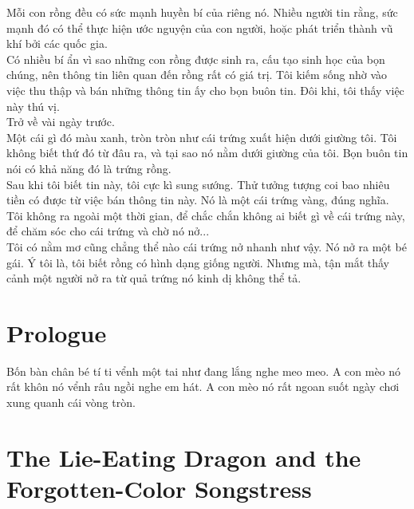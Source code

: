 \documentclass[13pt]{extarticle}
\begin{document}
	Mỗi con rồng đều có sức mạnh huyền bí của riêng nó. Nhiều người tin rằng, sức mạnh đó có thể thực hiện ước nguyện của con người, hoặc phát triển thành vũ khí bởi các quốc gia. \\
	
	Có nhiều bí ẩn vì sao những con rồng được sinh ra, cấu tạo sinh học của bọn chúng, nên thông tin liên quan đến rồng rất có giá trị. Tôi kiếm sống nhờ vào việc thu thập và bán những thông tin ấy cho bọn buôn tin. Đôi khi, tôi thấy việc này thú vị. \\
	
	Trở về vài ngày trước. \\
	
	Một cái gì đó màu xanh, tròn tròn như cái trứng xuất hiện dưới giường tôi. Tôi không biết thứ đó từ đâu ra, và tại sao nó nằm dưới giường của tôi. Bọn buôn tin nói có khả năng đó là trứng rồng. \\ 
	
	Sau khi tôi biết tin này, tôi cực kì sung sướng. Thử tưởng tượng coi bao nhiêu tiền có được từ việc bán thông tin này. Nó là một cái trứng vàng, đúng nghĩa. Tôi không ra ngoài một thời gian, để chắc chắn không ai biết gì về cái trứng này, để chăm sóc cho cái trứng và chờ nó nở... \\
	
	Tôi có nằm mơ cũng chẳng thể nào cái trứng nở nhanh như vậy. Nó nở ra một bé gái. Ý tôi là, tôi biết rồng có hình dạng giống người. Nhưng mà, tận mắt thấy cảnh một người nở ra từ quả trứng nó kinh dị không thể tả. \\
	
	
	
	
	
	
	
	
	

	
	\section{Prologue}
		Bốn bàn chân bé tí ti 
	vểnh một tai như đang lắng nghe meo meo.
	A con mèo nó rất khôn 
	nó vểnh râu ngồi nghe em hát.
	A con mèo nó rất ngoan 
	suốt ngày chơi xung quanh cái vòng tròn. 
	
	\section{The Lie-Eating Dragon and the Forgotten-Color Songstress}
	
\end{document}

